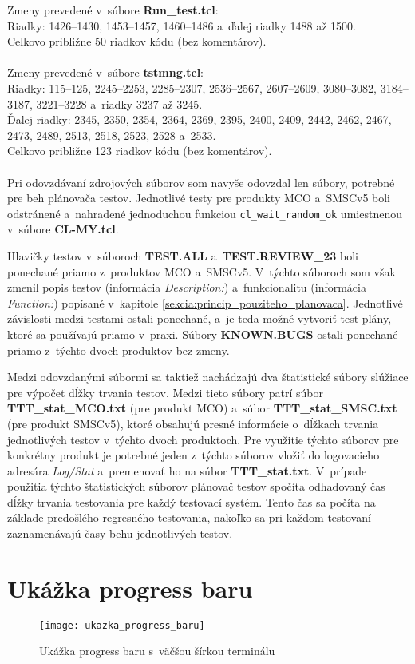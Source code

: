 \noindent Zmeny prevedené v~súbore \textbf{Run\_test.tcl}: \\
Riadky: 1426--1430, 1453--1457, 1460--1486 a~ďalej riadky 1488 až 1500. \\
Celkovo približne 50 riadkov kódu (bez komentárov).
\\
\\
\noindent Zmeny prevedené v~súbore \textbf{tstmng.tcl}: \\
Riadky: 115--125, 2245--2253, 2285--2307, 2536--2567, 2607--2609, 
3080--3082, 3184--3187, 3221--3228 a~riadky 3237 až 3245. \\
Ďalej riadky: 2345, 2350, 2354, 2364, 2369, 2395, 2400, 2409, 2442, 
2462, 2467, 2473, 2489, 2513, 2518, 2523, 2528 a~2533. \\
Celkovo približne 123 riadkov kódu (bez komentárov).
\\
\\
Pri odovzdávaní zdrojových súborov som navyše odovzdal len súbory,
potrebné pre beh plánovača testov. Jednotlivé testy pre produkty MCO
a~SMSCv5 boli odstránené a~nahradené jednoduchou funkciou \texttt{cl\_wait\_random\_ok}
umiestnenou v~súbore \textbf{CL-MY.tcl}. 

Hlavičky testov v~súboroch \textbf{TEST.ALL} a~\textbf{TEST.REVIEW\_23} 
boli ponechané priamo z~produktov MCO a~SMSCv5. V~týchto súboroch som 
však zmenil popis testov (informácia \textit{Description:}) a~funkcionalitu (informácia
\textit{Function:}) popísané v~kapitole \ref{sekcia:princip_pouziteho_planovaca}.
Jednotlivé závislosti medzi testami ostali ponechané, a~je teda možné 
vytvoriť test plány, ktoré sa používajú priamo v~praxi.
Súbory \textbf{KNOWN.BUGS} ostali ponechané priamo z~týchto
dvoch produktov bez zmeny. 

Medzi odovzdanými súbormi sa taktiež nachádzajú dva štatistické súbory slúžiace pre výpočet
dĺžky trvania testov. Medzi tieto súbory patrí súbor \textbf{TTT\_stat\_MCO.txt} (pre produkt MCO) 
a~súbor \textbf{TTT\_stat\_SMSC.txt} (pre produkt SMSCv5), ktoré obsahujú presné informácie o~dĺžkach
trvania jednotlivých testov v~týchto dvoch produktoch. Pre využitie týchto
súborov pre konkrétny produkt je potrebné jeden z~týchto súborov vložiť do logovacieho adresára \textit{Log/Stat} 
a~premenovať ho na súbor \textbf{TTT\_stat.txt}.
V~prípade použitia týchto štatistických súborov plánovač testov spočíta
odhadovaný čas dĺžky trvania testovania pre každý testovací systém.
Tento čas sa počíta na základe predošlého regresného testovania,
nakoľko sa pri každom testovaní zaznamenávajú časy behu jednotlivých testov.


\chapter{Ukážka progress baru}
\label{priloha:ukazka_progress_baru}
\begin{figure}[h]
  \begin{center}
    \texttt{[image: ukazka\_progress\_baru]}
    \caption{Ukážka progress baru s~väčšou šírkou terminálu}
  \end{center}
\end{figure}

